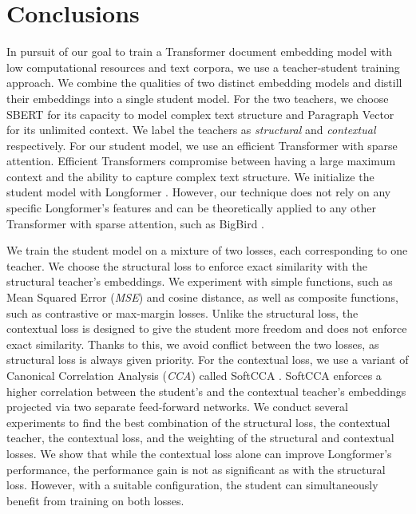 \chapter*{Conclusions}

In pursuit of our goal to train a Transformer document embedding model with low
computational resources and text corpora, we use a teacher-student training
approach. We combine the qualities of two distinct embedding models and distill
their embeddings into a single student model. For the two teachers, we choose
SBERT \citep{reimers2019sentence} for its capacity to model complex text
structure and Paragraph Vector \citep{le2014distributed} for its unlimited
context. We label the teachers as \emph{structural} and \emph{contextual}
respectively. For our student model, we use an efficient Transformer with
sparse attention. Efficient Transformers compromise between having a large
maximum context and the ability to capture complex text structure. We
initialize the student model with Longformer \citep{beltagy2020longformer}.
However, our technique does not rely on any specific Longformer's features and
can be theoretically applied to any other Transformer with sparse attention,
such as BigBird \citep{zaheer2020big}.

We train the student model on a mixture of two losses, each corresponding to
one teacher. We choose the structural loss to enforce exact similarity with the
structural teacher's embeddings. We experiment with simple functions, such as
Mean Squared Error (\emph{MSE}) and cosine distance, as well as composite
functions, such as contrastive or max-margin losses. Unlike the structural
loss, the contextual loss is designed to give the student more freedom and does
not enforce exact similarity. Thanks to this, we avoid conflict between the two
losses, as structural loss is always given priority. For the contextual loss,
we use a variant of Canonical Correlation Analysis (\emph{CCA})
\citep{hotelling1992relations} called SoftCCA \citep{chen2016training}. SoftCCA
enforces a higher correlation between the student's and the contextual
teacher's embeddings projected via two separate feed-forward networks. We
conduct several experiments to find the best combination of the structural
loss, the contextual teacher, the contextual loss, and the weighting of the
structural and contextual losses. We show that while the contextual loss alone
can improve Longformer's performance, the performance gain is not as
significant as with the structural loss. However, with a suitable
configuration, the student can simultaneously benefit from training on both
losses.

